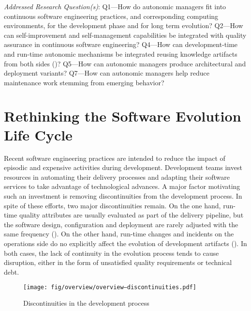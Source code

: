 \label{chapter:contribution-overview}

\minitoc

\begin{InfoBox}
	\emph{Addressed Research Question(s)}: \textsc{Q}1---How do autonomic managers fit into continuous software engineering practices, and corresponding computing environments, for the development phase and for long term evolution? \textsc{Q}2---How can self-improvement and self-management capabilities be integrated with quality assurance in continuous software engineering? \textsc{Q}4---How can development-time and run-time autonomic mechanisms be integrated reusing knowledge artifacts from both sides ()? \textsc{Q}5---How can autonomic managers produce architectural and deployment variants? \textsc{Q}7---How can autonomic managers help reduce maintenance work stemming from emerging behavior?
\end{InfoBox}

\section{Rethinking the Software Evolution Life Cycle}
\label{sect:overview--off-line-and-on-line-reconceptualization}

Recent software engineering practices are intended to reduce the impact of episodic and expensive activities during development. Development teams invest resources in automating their delivery processes and adapting their software services to take advantage of technological advances. A major factor motivating such an investment is removing discontinuities from the development process. In spite of these efforts, two major discontinuities remain. On the one hand, run-time quality attributes are usually evaluated as part of the delivery pipeline, but the software design, configuration and deployment are rarely adjusted with the same frequency (). On the other hand, run-time changes and incidents on the operations side do no explicitly affect the evolution of development artifacts (). In both cases, the lack of continuity in the evolution process tends to cause disruption, either in the form of unsatisfied quality requirements or technical debt.

\begin{figure}[h]
	\centering
	\texttt{[image: fig/overview/overview--discontinuities.pdf]}
	\caption{Discontinuities in the development process}
	\label{fig:overview--discontinuities}
\end{figure}

